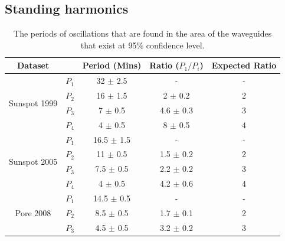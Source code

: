 \subsection{Standing harmonics}

	\begin{table}
	\centering
	\begin{tabular}{ccccc}
		\hline
		Dataset & & Period (Mins) & Ratio ($P_{1}/P_{i}$) & Expected Ratio \\ \hline \hline
		\multirow{4}{*}{Sunspot 1999} & $P_{1}$ & 32 $\pm$ 2.5 & - & -\\
							  		  & $P_{2}$ & 16 $\pm$ 1.5 & 2 $\pm$ 0.2 & 2\\
							  		  & $P_{3}$ & 7 $\pm$ 0.5 & 4.6 $\pm$ 0.3 & 3\\
							  		  & $P_{4}$ & 4 $\pm$ 0.5 & 8 $\pm$ 0.5 & 4\\ \hline
		\multirow{4}{*}{Sunspot 2005} & $P_{1}$ & 16.5 $\pm$ 1.5  & - & -\\
					      			  & $P_{2}$ & 11 $\pm$ 0.5 & 1.5 $\pm$ 0.2 & 2\\
					      			  & $P_{3}$ & 7.5 $\pm$ 0.5 & 2.2 $\pm$ 0.2 & 3\\
					      			  & $P_{4}$ & 4 $\pm$ 0.5 & 4.2 $\pm$ 0.6 & 4\\ \hline
		\multirow{4}{*}{Pore 2008}    & $P_{1}$ & 14.5 $\pm$ 0.5 & - & -\\
		 							  & $P_{2}$ & 8.5 $\pm$ 0.5 & 1.7 $\pm$ 0.1 & 2\\
					      			  & $P_{3}$ & 4.5 $\pm$ 0.5 & 3.2 $\pm$ 0.2 & 3\\ \hline
	\end{tabular}
		\caption{The periods of oscillations that are found in the area of the waveguides that exist at 95\% confidence level.}
		\label{chap3:harm_table}
	\end{table}
		
